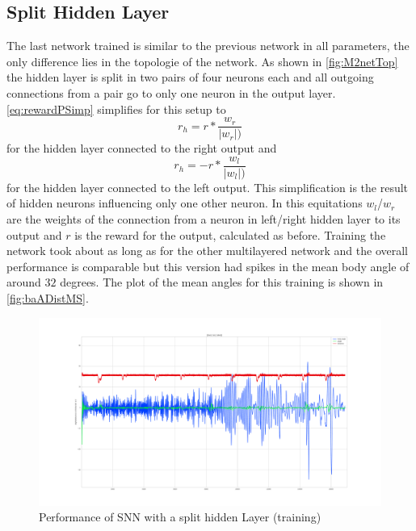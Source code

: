\subsection{Split Hidden Layer}
The last network trained is similar to the previous network in all parameters, the only difference lies in the topologie of the network. As shown in \autoref{fig:M2netTop} the hidden layer is split in two pairs of four neurons each and all outgoing connections from a pair go to only one neuron in the output layer. \autoref{eq:rewardPSimp} simplifies for this setup to
\begin{equation}
r_h = r * \frac{w_r} {|w_r|)}
\end{equation}
for the hidden layer connected to the right output and
\begin{equation}
r_h = - r * \frac{w_l} {|w_l|)}
\end{equation}
for the hidden layer connected to the left output. This simplification is the result of hidden neurons influencing only one other neuron. In this equitations $w_l$/$w_r$ are the weights of the connection from a neuron in left/right hidden layer to its output and $r$ is the reward for the output, calculated as before.
Training the network took about as long as for the other multilayered network and the overall performance is comparable but this version had spikes in the mean body angle of around $32$ degrees. The plot of the mean angles for this training is shown in \autoref{fig:baADistMS}.
\begin{figure}[htpb]
  \centering
  \includegraphics[width=\textwidth]{figures/plots/baADistMS}
  \caption{ Performance of SNN with a split hidden Layer (training)  }
  \label{fig:baADistMS}
\end{figure}


